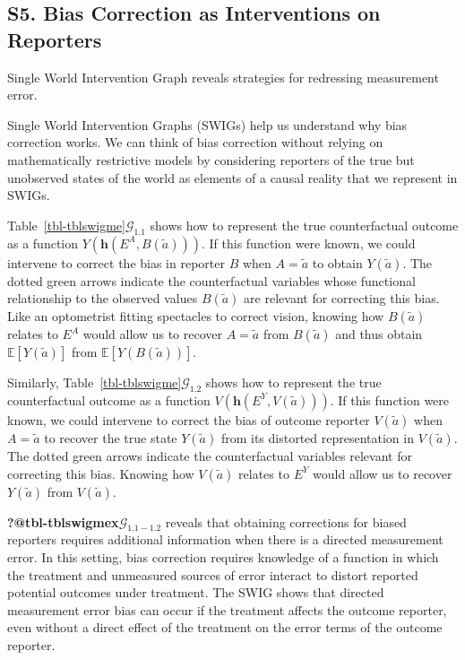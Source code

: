 \documentclass[
  single column]{article}
\begin{document}
\newpage{}

\subsection{S5. Bias Correction as Interventions on
Reporters}\label{id-app-F}

\begin{table}

\caption{\label{tbl-tblswigme}Single World Intervention Graph reveals
strategies for redressing measurement error.}

\centering{

\tblswigme

}

\end{table}%

Single World Intervention Graphs (SWIGs) help us understand why bias
correction works. We can think of bias correction without relying on
mathematically restrictive models by considering reporters of the true
but unobserved states of the world as elements of a causal reality that
we represent in SWIGs.

Table~\ref{tbl-tblswigme}\(\mathcal{G}_{1.1}\) shows how to represent
the true counterfactual outcome as a function
\(Y(\mathbf{h}(E^A, B(\tilde{a})))\). If this function were known, we
could intervene to correct the bias in reporter \(B\) when
\(A = \tilde{a}\) to obtain \(Y(\tilde{a})\). The dotted green arrows
indicate the counterfactual variables whose functional relationship to
the observed values \(B(\tilde{a})\) are relevant for correcting this
bias. Like an optometrist fitting spectacles to correct vision, knowing
how \(B(\tilde{a})\) relates to \(E^A\) would allow us to recover
\(A = \tilde{a}\) from \(B(\tilde{a})\) and thus obtain
\(\mathbb{E}[Y(\tilde{a})]\) from \(\mathbb{E}[Y(B(\tilde{a}))]\).

Similarly, Table~\ref{tbl-tblswigme}\(\mathcal{G}_{1.2}\) shows how to
represent the true counterfactual outcome as a function
\(V(\mathbf{h}(E^Y, V(\tilde{a})))\). If this function were known, we
could intervene to correct the bias of outcome reporter \(V(\tilde{a})\)
when \(A = \tilde{a}\) to recover the true state \(Y(\tilde{a})\) from
its distorted representation in \(V(\tilde{a})\). The dotted green
arrows indicate the counterfactual variables relevant for correcting
this bias. Knowing how \(V(\tilde{a})\) relates to \(E^Y\) would allow
us to recover \(Y(\tilde{a})\) from \(V(\tilde{a})\).

\textbf{?@tbl-tblswigmex}\(\mathcal{G}_{1.1-1.2}\) reveals that
obtaining corrections for biased reporters requires additional
information when there is a directed measurement error. In this setting,
bias correction requires knowledge of a function in which the treatment
and unmeasured sources of error interact to distort reported potential
outcomes under treatment. The SWIG shows that directed measurement error
bias can occur if the treatment affects the outcome reporter, even
without a direct effect of the treatment on the error terms of the
outcome reporter.
\end{document}
